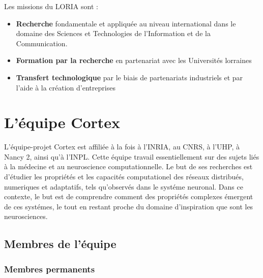 Les missions du LORIA sont :
\begin{itemize}
   \item \textbf{Recherche} fondamentale et appliquée au niveau international dans le domaine des Sciences et
      Technologies de l'Information et de la Communication.
   \item \textbf{Formation par la recherche} en partenariat avec les Universités lorraines
   \item \textbf{Transfert technologique} par le biais de partenariats industriels et par l'aide à la création
      d'entreprises
\end{itemize}


\section{L'équipe Cortex} %
\label{sec:Cortex}

L'équipe-projet Cortex est affiliée à la fois à l'INRIA, au CNRS, à l'UHP, à Nancy 2,
ainsi qu'à l'INPL. Cette équipe travail essentiellement sur des sujets liés à la médecine et au neuroscience
computationnelle.
Le but de ses recherches est d'étudier les propriétés et les capacités computationel des réseaux distribués,
numeriques et adaptatifs, tels qu'observés dans le systéme neuronal. Dans ce contexte, le but est de
comprendre comment des propriétés complexes émergent de ces systémes, le tout en restant proche du domaine
d'inspiration que sont les neurosciences. 

\subsection{Membres de l'équipe} %
\label{sub:Membres de l'équipe}

\subsubsection{Membres permanents} %
\label{ssub:Membres permanents}

